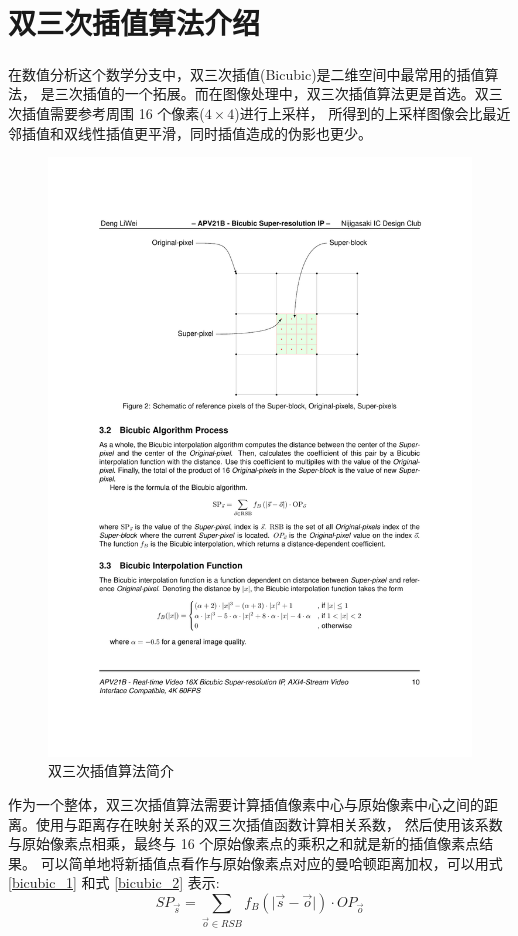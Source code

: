 \documentclass[12pt, a4paper, oneside]{ctexbook}
\begin{document}
	\section{双三次插值算法介绍}
	在数值分析这个数学分支中，双三次插值(Bicubic)\textsuperscript{\cite{10}\cite{11}}是二维空间中最常用的插值算法，
	是三次插值的一个拓展。而在图像处理中，双三次插值算法更是首选。双三次插值需要参考周围 16 个像素($4 \times 4$)进行上采样，
	所得到的上采样图像会比最近邻插值和双线性插值更平滑，同时插值造成的伪影也更少。
		\begin{figure}[h]
			\centering
			\includegraphics[scale=1]{./pic/bicubic-introduction.pdf}
			\caption{双三次插值算法简介}
			\label{bicubic_introduction}
		\end{figure}
	\par
	作为一个整体，双三次插值算法需要计算插值像素中心与原始像素中心之间的距离。使用与距离存在映射关系的双三次插值函数计算相关系数，
	然后使用该系数与原始像素点相乘，最终与 16 个原始像素点的乘积之和就是新的插值像素点结果。
	可以简单地将新插值点看作与原始像素点对应的曼哈顿距离加权，可以用式 \ref{bicubic_1} 和式 \ref{bicubic_2} 表示:
	\begin{equation}
	SP_{\vec{s}}=\sum_{\vec{o}\in{RSB}}f_B(\vert\vec{s}-\vec{o}\vert)\cdot OP_{\vec{o}}		
	\label{bicubic_1}
	\end{equation}	
\end{document}
